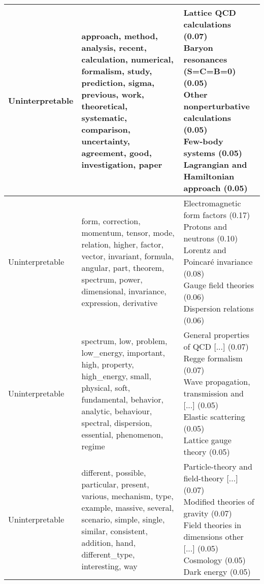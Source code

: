 \begin{longtable}{p{}|b{}|b{}}
               Uninterpretable &                                                 approach, method, analysis, recent, calculation, numerical, formalism, study, prediction, sigma, previous, work, theoretical, systematic, comparison, uncertainty, agreement, good, investigation, paper &                                                \shortstack[l]{Lattice QCD calculations (0.07)\\ Baryon resonances (S=C=B=0) (0.05)\\ Other nonperturbative calculations (0.05)\\ Few-body systems (0.05)\\ Lagrangian and Hamiltonian approach (0.05)}\\ \hline
               Uninterpretable &                                                                 form, correction, momentum, tensor, mode, relation, higher, factor, vector, invariant, formula, angular, part, theorem, spectrum, power, dimensional, invariance, expression, derivative &                                                                 \shortstack[l]{Electromagnetic form factors (0.17)\\ Protons and neutrons (0.10)\\ Lorentz and Poincaré invariance (0.08)\\ Gauge field theories (0.06)\\ Dispersion relations (0.06)}\\ \hline
               Uninterpretable &                                                     spectrum, low, problem, low\_energy, important, high, property, high\_energy, small, physical, soft, fundamental, behavior, analytic, behaviour, spectral, dispersion, essential, phenomenon, regime &                                                            \shortstack[l]{General properties of QCD [...] (0.07)\\ Regge formalism (0.07)\\ Wave propagation, transmission and [...] (0.05)\\ Elastic scattering (0.05)\\ Lattice gauge theory (0.05)}\\ \hline
               Uninterpretable &                                                          different, possible, particular, present, various, mechanism, type, example, massive, several, scenario, simple, single, similar, consistent, addition, hand, different\_type, interesting, way &                                                          \shortstack[l]{Particle-theory and field-theory [...] (0.07)\\ Modified theories of gravity (0.07)\\ Field theories in dimensions other [...] (0.05)\\ Cosmology (0.05)\\ Dark energy (0.05)}\\ \hline
\end{longtable}
